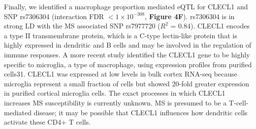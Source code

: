 Finally, we identified a macrophage proportion mediated eQTL for CLECL1 and SNP rs7306304 (interaction  FDR $< 1 \times 10^{-308}$, \textbf{Figure 4F}). rs7306304 is in strong LD with the MS associated SNP rs7977720 ($R^2$ = 0.84)\cite{consortium*+MultipleSclerosisGenomic2019}. CLECL1 encodes a type II transmembrane protein, which is a C-type lectin-like protein that is highly expressed in dendritic and B cells and may be involved in the regulation of immune responses\cite{vanluijnMultipleSclerosisassociatedCLEC16A2015}. A more recent study identified the CLECL1 gene to be highly specific to microglia, a type of macrophage, using expression profiles from purified cells31. CLECL1 was expressed at low levels in bulk cortex RNA-seq because microglia represent a small fraction of cells but showed 20-fold greater expression in purified cortical microglia cells\cite{consortium*+MultipleSclerosisGenomic2019}. The exact processes in which CLECL1 increases MS susceptibility is currently unknown. MS is presumed to be a T-cell- mediated disease; it may be possible that CLECL1 influences how dendritic cells activate these CD4+ T cells. 

